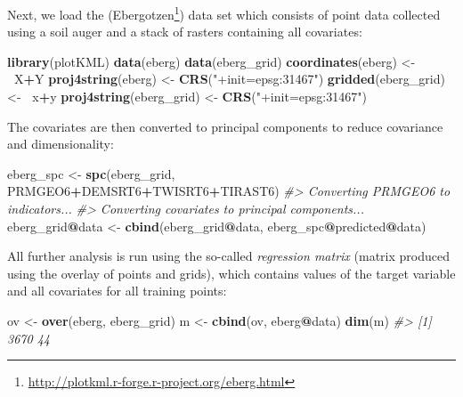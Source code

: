 \documentclass[graybox,natbib,nospthms,UStrade]{svmono}
\newenvironment{Shaded}{\begin{snugshade}}{\end{snugshade}}
\newcommand{\CommentTok}[1]{\textcolor[rgb]{0.37,0.37,0.37}{\textit{#1}}}
\newcommand{\ErrorTok}[1]{\textcolor[rgb]{0.14,0.14,0.14}{\textbf{#1}}}
\newcommand{\KeywordTok}[1]{\textcolor[rgb]{0.27,0.27,0.27}{\textbf{#1}}}
\newcommand{\NormalTok}[1]{#1}
\newcommand{\OperatorTok}[1]{\textcolor[rgb]{0.43,0.43,0.43}{\textbf{#1}}}
\newcommand{\StringTok}[1]{\textcolor[rgb]{0.5,0.5,0.5}{#1}}
\renewcommand{\href}[2]{#2 (\url{#1})}
\renewcommand{\href}[2]{#2\footnote{\url{#1}}}
\begin{document}
Next, we load the (\href{http://plotkml.r-forge.r-project.org/eberg.html}{Ebergotzen}) data set which consists of point data collected using a soil auger and a stack of rasters containing all covariates:

\begin{Shaded}
\begin{Highlighting}[]
\KeywordTok{library}\NormalTok{(plotKML)}
\KeywordTok{data}\NormalTok{(eberg)}
\KeywordTok{data}\NormalTok{(eberg_grid)}
\KeywordTok{coordinates}\NormalTok{(eberg) <-}\StringTok{ }\ErrorTok{~}\NormalTok{X}\OperatorTok{+}\NormalTok{Y}
\KeywordTok{proj4string}\NormalTok{(eberg) <-}\StringTok{ }\KeywordTok{CRS}\NormalTok{(}\StringTok{"+init=epsg:31467"}\NormalTok{)}
\KeywordTok{gridded}\NormalTok{(eberg_grid) <-}\StringTok{ }\ErrorTok{~}\NormalTok{x}\OperatorTok{+}\NormalTok{y}
\KeywordTok{proj4string}\NormalTok{(eberg_grid) <-}\StringTok{ }\KeywordTok{CRS}\NormalTok{(}\StringTok{"+init=epsg:31467"}\NormalTok{)}
\end{Highlighting}
\end{Shaded}

The covariates are then converted to principal components to reduce covariance and dimensionality:

\begin{Shaded}
\begin{Highlighting}[]
\NormalTok{eberg_spc <-}\StringTok{ }\KeywordTok{spc}\NormalTok{(eberg_grid, }\OperatorTok{~}\StringTok{ }\NormalTok{PRMGEO6}\OperatorTok{+}\NormalTok{DEMSRT6}\OperatorTok{+}\NormalTok{TWISRT6}\OperatorTok{+}\NormalTok{TIRAST6)}
\CommentTok{#> Converting PRMGEO6 to indicators...}
\CommentTok{#> Converting covariates to principal components...}
\NormalTok{eberg_grid}\OperatorTok{@}\NormalTok{data <-}\StringTok{ }\KeywordTok{cbind}\NormalTok{(eberg_grid}\OperatorTok{@}\NormalTok{data, eberg_spc}\OperatorTok{@}\NormalTok{predicted}\OperatorTok{@}\NormalTok{data)}
\end{Highlighting}
\end{Shaded}

All further analysis is run using the so-called \emph{regression matrix} (matrix produced using the overlay of points and grids), which contains values of the target variable and all covariates for all training points:

\begin{Shaded}
\begin{Highlighting}[]
\NormalTok{ov <-}\StringTok{ }\KeywordTok{over}\NormalTok{(eberg, eberg_grid)}
\NormalTok{m <-}\StringTok{ }\KeywordTok{cbind}\NormalTok{(ov, eberg}\OperatorTok{@}\NormalTok{data)}
\KeywordTok{dim}\NormalTok{(m)}
\CommentTok{#> [1] 3670   44}
\end{Highlighting}
\end{Shaded}
\end{document}
